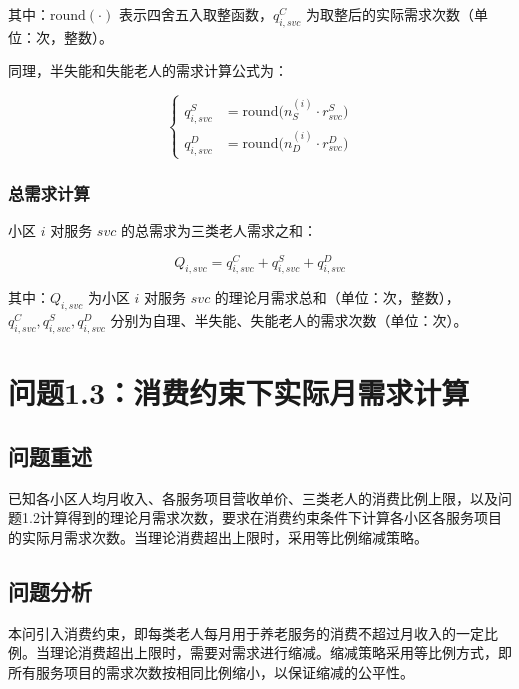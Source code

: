 \documentclass[12pt,a4paper]{article}
\begin{document}
其中：$\text{round}(\cdot)$ 表示四舍五入取整函数，$q_{i,svc}^C$ 为取整后的实际需求次数（单位：次，整数）。

同理，半失能和失能老人的需求计算公式为：

\begin{equation}
\left\{
\begin{aligned}
q_{i,svc}^S &= \text{round}\bigl(n_S^{(i)} \cdot r_{svc}^S\bigr) \\
q_{i,svc}^D &= \text{round}\bigl(n_D^{(i)} \cdot r_{svc}^D\bigr)
\end{aligned}
\right.
\tag{2.3}
\end{equation}

\subsubsection{总需求计算}

小区 $i$ 对服务 $svc$ 的总需求为三类老人需求之和：

\begin{equation}
Q_{i,svc} = q_{i,svc}^C + q_{i,svc}^S + q_{i,svc}^D
\tag{2.4}
\end{equation}

其中：$Q_{i,svc}$ 为小区 $i$ 对服务 $svc$ 的理论月需求总和（单位：次，整数），$q_{i,svc}^C, q_{i,svc}^S, q_{i,svc}^D$ 分别为自理、半失能、失能老人的需求次数（单位：次）。


\section{问题1.3：消费约束下实际月需求计算}

\subsection{问题重述}

已知各小区人均月收入、各服务项目营收单价、三类老人的消费比例上限，以及问题1.2计算得到的理论月需求次数，要求在消费约束条件下计算各小区各服务项目的实际月需求次数。当理论消费超出上限时，采用等比例缩减策略。

\subsection{问题分析}

本问引入消费约束，即每类老人每月用于养老服务的消费不超过月收入的一定比例。当理论消费超出上限时，需要对需求进行缩减。缩减策略采用等比例方式，即所有服务项目的需求次数按相同比例缩小，以保证缩减的公平性。
\end{document}
